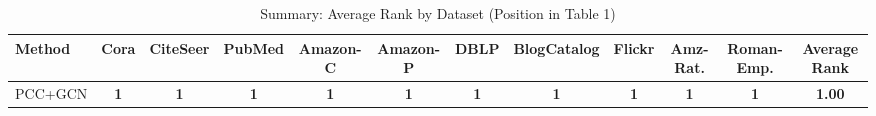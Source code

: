 \begin{table}[htbp]
\centering
\small
\caption{Summary: Average Rank by Dataset (Position in Table 1)}
\label{tab:summary_ranking}
\begin{tabular}{lccccccccccc}
\toprule
\textbf{Method} & \textbf{Cora} & \textbf{CiteSeer} & \textbf{PubMed} & \textbf{Amazon-C} & \textbf{Amazon-P} & \textbf{DBLP} & \textbf{BlogCatalog} & \textbf{Flickr} & \textbf{Amz-Rat.} & \textbf{Roman-Emp.} & \textbf{Average Rank} \\
\midrule
PCC+GCN & \cellcolor[HTML]{A8D08D}\textbf{1} & \cellcolor[HTML]{A8D08D}\textbf{1} & \cellcolor[HTML]{A8D08D}\textbf{1} & \cellcolor[HTML]{A8D08D}\textbf{1} & \cellcolor[HTML]{A8D08D}\textbf{1} & \cellcolor[HTML]{A8D08D}\textbf{1} & \cellcolor[HTML]{A8D08D}\textbf{1} & \cellcolor[HTML]{A8D08D}\textbf{1} & \cellcolor[HTML]{A8D08D}\textbf{1} & \cellcolor[HTML]{A8D08D}\textbf{1} & \cellcolor[HTML]{A8D08D}\textbf{1.00} \\
\bottomrule
\end{tabular}
\end{table}
